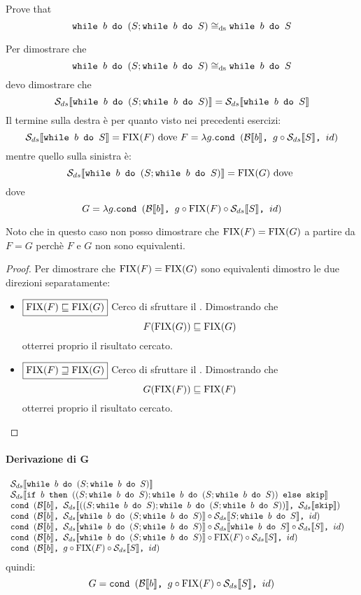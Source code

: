 {Prove that
$$
	 \wbS{b}{(S; \wbS{b}{S})} \eqDS \wbS{b}{S}
$$
}
{
Per dimostrare che 
$$
	 \wbS{b}{(S; \wbS{b}{S})} \eqDS \wbS{b}{S}
$$	
devo dimostrare che
$$
\dsCtxt{\wbS{b}{(S; \wbS{b}{S})}} = \dsCtxt{\wbS{b}{S}} 
$$
Il termine sulla destra è per quanto visto nei precedenti esercizi:
$$
\dsCtxt{\wbS{b}{S}} = \fixp{F} \text{ dove } F = \lambda g. \cond{b}{g \circ \dsCtxt{S}}{id}
$$
mentre quello sulla sinistra è:
$$
\dsCtxt{\wbS{b}{(S; \wbS{b}{S}})} = \fixp{G} \text{ dove } 
$$
dove 
$$
G = \lambda g. \cond{b}{g \circ \fixp{F} \circ \dsCtxt{S}}{id} 
$$

Noto che in questo caso non posso dimostrare che $\fixp{F} = \fixp{G}$ a partire da $F = G$ perchè
$F$ e $G$ non sono equivalenti.

\begin{proof}
Per dimostrare che $\fixp{F} = \fixp{G}$ sono equivalenti dimostro le due direzioni separatamente:
\begin{itemize}
	\item $\boxed{\fixp{F} \sqsubseteq \fixp{G}}$
	Cerco di sfruttare il \FPIL. Dimostrando che
	$$
	F(\fixp{G}) \sqsubseteq \fixp{G} 
	$$
	otterrei proprio il risultato cercato.
	\item $\boxed{\fixp{F} \sqsupseteq \fixp{G}}$
	Cerco di sfruttare il \FPIL. Dimostrando che
	$$
	G(\fixp{F}) \sqsubseteq \fixp{F} 
	$$
	otterrei proprio il risultato cercato.
\end{itemize}

\end{proof}
\paragraph{Derivazione di G}
$$
\begin{array}{ll}
\dsCtxt{\wbS{b}{(S; \wbS{b}{S})}} & \\
\dsCtxt{\ifABC{b}{((S; \wbS{b}{S}); \wbS{b}{(S; \wbS{b}{S})})}{\skipForFriends}} & \\
\cond{b}{\dsCtxt{((S; \wbS{b}{S}); \wbS{b}{(S; \wbS{b}{S})})}}{\dsCtxt{\skipForFriends}}\\
\cond{b}{\dsCtxt{\wbS{b}{(S; \wbS{b}{S})}} \circ \dsCtxt{S; \wbS{b}{S}}}{id} & \\
\cond{b}{\dsCtxt{\wbS{b}{(S; \wbS{b}{S})}} \circ \dsCtxt{\wbS{b}{S}} \circ \dsCtxt{S}}{id} & \\
\cond{b}{\dsCtxt{\wbS{b}{(S; \wbS{b}{S})}} \circ \fixp{F} \circ \dsCtxt{S}}{id} & \\
\cond{b}{g \circ \fixp{F} \circ \dsCtxt{S}}{id} & \\
\end{array}
$$
quindi:
$$
G = \cond{b}{g \circ \fixp{F} \circ \dsCtxt{S}}{id}
$$
}
